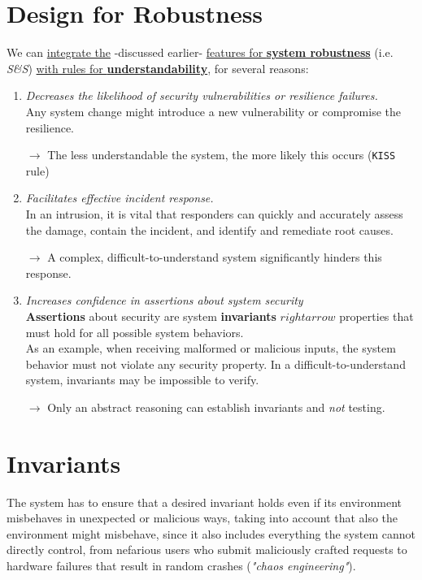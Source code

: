 \section{Design for Robustness}
We can \ul{integrate the} -discussed earlier- \ul{features for \textbf{system robustness}} (i.e. \textit{S\&S}) \ul{with rules for \textbf{understandability}}, for several reasons:
\begin{enumerate}
   \item \textit{Decreases the likelihood of security vulnerabilities or resilience failures.}\\
   Any system change might introduce a new vulnerability or compromise the resilience.

   $\longrightarrow$ The less understandable the system, the more likely this occurs (\texttt{KISS} rule)
   
   \item \textit{Facilitates effective incident response.}\\
   In an intrusion, it is vital that responders can quickly and accurately assess the
   damage, contain the incident, and identify and remediate root causes.

   $\longrightarrow$ A complex, difficult-to-understand system significantly hinders this response.
   
   \item \textit{Increases confidence in assertions about system security}\\
   \textbf{Assertions} about security are system \textbf{invariants} $rightarrow$ properties that must hold for all possible
   system behaviors.\\ 
   As an example, when receiving malformed or malicious inputs, the system behavior must not violate any security property.
   In a difficult-to-understand
   system, invariants may be impossible to verify.

   $\longrightarrow$ Only an abstract reasoning can establish invariants and \textit{not} testing.
\end{enumerate}

\section{Invariants}
The system has to ensure that a desired invariant holds
even if its environment misbehaves in unexpected or malicious ways, 
taking into account that also the environment might misbehave, 
since it also includes everything the system cannot directly control, from
nefarious users who submit maliciously crafted requests to hardware failures
that result in random crashes (\textit{"chaos engineering"}).

